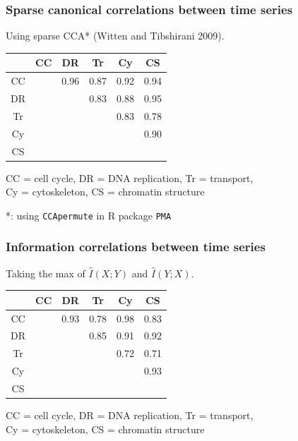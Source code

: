 \documentclass{beamer}
\begin{document}
\begin{frame}
\frametitle{Sparse canonical correlations between time series}
Using sparse CCA* (Witten and Tibshirani 2009).

\begin{center}
\begin{tabular}{c|c|c|c|c|c|} 
   & CC   & DR   & Tr   & Cy   & CS \\ \hline
CC &      & 0.96 & 0.87 & 0.92 & 0.94\\ \hline
DR &      &      & 0.83 & 0.88 & 0.95\\ \hline
Tr &      &      &      & 0.83 & 0.78\\ \hline
Cy &      &      &      &      & 0.90\\ \hline
CS &      &      &      &      &     \\ \hline
\end{tabular}
\end{center}

\vspace{0.5in}
CC = cell cycle, DR = DNA replication, Tr = transport, \\
Cy = cytoskeleton, CS = chromatin structure

\vspace{0.1in}

\tiny{*: using {\tt CCApermute} in R package {\tt PMA}}
\end{frame}



\begin{frame}
\frametitle{Information correlations between time series}
Taking the max of $\hat{I}(X; Y)$ and $\hat{I}(Y; X)$.

\begin{center}
\begin{tabular}{c|c|c|c|c|c|} 
   & CC   & DR   & Tr   & Cy   & CS \\ \hline
CC &      & 0.93 & 0.78 & 0.98 & 0.83\\ \hline
DR &      &      & 0.85 & 0.91 & 0.92\\ \hline
Tr &      &      &      & 0.72 & 0.71\\ \hline
Cy &      &      &      &      & 0.93\\ \hline
CS &      &      &      &      &     \\ \hline
\end{tabular}
\end{center}

\vspace{0.5in}
CC = cell cycle, DR = DNA replication, Tr = transport, \\
Cy = cytoskeleton, CS = chromatin structure
\end{frame}
\end{document}
